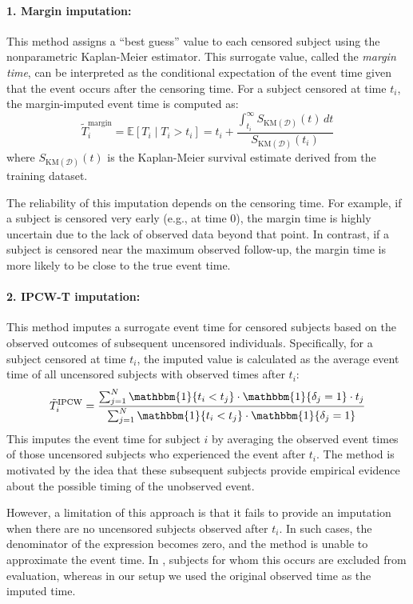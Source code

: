 \documentclass{article} %
\begin{document}
\paragraph{1. Margin imputation:}
This method assigns a “best guess” value to each censored subject using the nonparametric Kaplan-Meier estimator. This surrogate value, called the \emph{margin time}, can be interpreted as the conditional expectation of the event time given that the event occurs after the censoring time. For a subject censored at time \( t_i \), the margin-imputed event time is computed as:
\begin{equation}
\tilde{T}^{\text{margin}}_i 
= \mathbb{E}[T_i \mid T_i > t_i] 
= t_i + \frac{\int_{t_i}^{\infty} S_{\text{KM}(\mathcal{D})}(t) \, dt}{S_{\text{KM}(\mathcal{D})}(t_i)}
\end{equation}
where \( S_{\text{KM}(\mathcal{D})}(t) \) is the Kaplan-Meier survival estimate derived from the training dataset.

The reliability of this imputation depends on the censoring time. For example, if a subject is censored very early (e.g., at time 0), the margin time is highly uncertain due to the lack of observed data beyond that point. In contrast, if a subject is censored near the maximum observed follow-up, the margin time is more likely to be close to the true event time.

\paragraph{2. IPCW-T imputation:}
This method imputes a surrogate event time for censored subjects based on the observed outcomes of subsequent uncensored individuals. Specifically, for a subject censored at time \( t_i \), the imputed value is calculated as the average event time of all uncensored subjects with observed times after \( t_i \):
\begin{equation}
\tilde{T}^{\text{IPCW}}_i = 
\frac{\sum_{j=1}^N \mathbbm{1}\{t_i < t_j\} \cdot \mathbbm{1}\{\delta_j = 1\} \cdot t_j}
     {\sum_{j=1}^N \mathbbm{1}\{t_i < t_j\} \cdot \mathbbm{1}\{\delta_j = 1\}}
\end{equation}
This imputes the event time for subject \( i \) by averaging the observed event times of those uncensored subjects who experienced the event after \( t_i \). The method is motivated by the idea that these subsequent subjects provide empirical evidence about the possible timing of the unobserved event.

However, a limitation of this approach is that it fails to provide an imputation when there are no uncensored subjects observed after \( t_i \). In such cases, the denominator of the expression becomes zero, and the method is unable to approximate the event time. In \citet{qi2023an}, subjects for whom this occurs are excluded from evaluation, whereas in our setup we used the original observed time as the imputed time.
\end{document}
